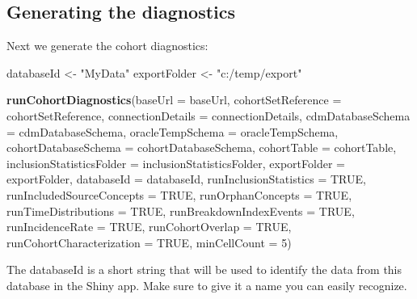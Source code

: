 \documentclass[
]{article}
\newenvironment{Shaded}{\begin{snugshade}}{\end{snugshade}}
\newcommand{\DataTypeTok}[1]{\textcolor[rgb]{0.13,0.29,0.53}{#1}}
\newcommand{\DecValTok}[1]{\textcolor[rgb]{0.00,0.00,0.81}{#1}}
\newcommand{\KeywordTok}[1]{\textcolor[rgb]{0.13,0.29,0.53}{\textbf{#1}}}
\newcommand{\NormalTok}[1]{#1}
\newcommand{\OtherTok}[1]{\textcolor[rgb]{0.56,0.35,0.01}{#1}}
\newcommand{\StringTok}[1]{\textcolor[rgb]{0.31,0.60,0.02}{#1}}
\begin{document}
\hypertarget{generating-the-diagnostics}{%
\subsection{Generating the
diagnostics}\label{generating-the-diagnostics}}

Next we generate the cohort diagnostics:

\begin{Shaded}
\begin{Highlighting}[]
\NormalTok{databaseId <-}\StringTok{ "MyData"}
\NormalTok{exportFolder <-}\StringTok{ "c:/temp/export"}

\KeywordTok{runCohortDiagnostics}\NormalTok{(}\DataTypeTok{baseUrl =}\NormalTok{ baseUrl,}
                     \DataTypeTok{cohortSetReference =}\NormalTok{ cohortSetReference,}
                     \DataTypeTok{connectionDetails =}\NormalTok{ connectionDetails,}
                     \DataTypeTok{cdmDatabaseSchema =}\NormalTok{ cdmDatabaseSchema,}
                     \DataTypeTok{oracleTempSchema =}\NormalTok{ oracleTempSchema,}
                     \DataTypeTok{cohortDatabaseSchema =}\NormalTok{ cohortDatabaseSchema,}
                     \DataTypeTok{cohortTable =}\NormalTok{ cohortTable,}
                     \DataTypeTok{inclusionStatisticsFolder =}\NormalTok{ inclusionStatisticsFolder,}
                     \DataTypeTok{exportFolder =}\NormalTok{ exportFolder,}
                     \DataTypeTok{databaseId =}\NormalTok{ databaseId,}
                     \DataTypeTok{runInclusionStatistics =} \OtherTok{TRUE}\NormalTok{,}
                     \DataTypeTok{runIncludedSourceConcepts =} \OtherTok{TRUE}\NormalTok{,}
                     \DataTypeTok{runOrphanConcepts =} \OtherTok{TRUE}\NormalTok{,}
                     \DataTypeTok{runTimeDistributions =} \OtherTok{TRUE}\NormalTok{,}
                     \DataTypeTok{runBreakdownIndexEvents =} \OtherTok{TRUE}\NormalTok{,}
                     \DataTypeTok{runIncidenceRate =} \OtherTok{TRUE}\NormalTok{,}
                     \DataTypeTok{runCohortOverlap =} \OtherTok{TRUE}\NormalTok{,}
                     \DataTypeTok{runCohortCharacterization =} \OtherTok{TRUE}\NormalTok{,}
                     \DataTypeTok{minCellCount =} \DecValTok{5}\NormalTok{)}
\end{Highlighting}
\end{Shaded}

The databaseId is a short string that will be used to identify the data
from this database in the Shiny app. Make sure to give it a name you can
easily recognize.
\end{document}
